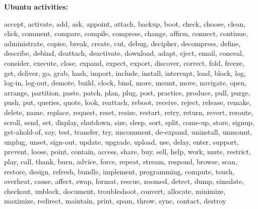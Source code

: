 \documentclass{article}
\begin{document}
\textbf{Ubuntu activities:}
\begin{framed}
\scriptsize
accept, activate, add, ask, appoint, attach, backup, boot, check, choose, clean, click, comment, compare, compile, compress, change, affirm, connect, continue, administrate, copies, break, create, cut, debug, decipher, decompress, define, describe, debind, deattach, deactivate, download, adapt, eject, email, conceal, consider, execute, close, expand, expect, export, discover, correct, fold, freeze, get, deliver, go, grab, hash, import, include, install, interrupt, load, block, log, log-in, log-out, demote, build, clock, bind, more, mount, move, navigate, open, arrange, partition, paste, patch, plan, plug, post, practice, produce, pull, purge, push, put, queries, quote, look, reattach, reboot, receive, reject, release, remake, delete, name, replace, request, reset, resize, restart, retry, return, revert, reroute, scroll, send, set, display, shutdown, size, sleep, sort, split, come-up, store, signup, get-ahold-of, say, test, transfer, try, uncomment, de-expand, uninstall, unmount, unplug, unset, sign-out, update, upgrade, upload, use, delay, enter, support, prevent, loose, point, contain, access, share, buy, sell, help, work, mute, restrict, play, call, thank, burn, advice, force, repeat, stream, respond, browse, scan, restore, design, refresh, bundle, implement, programming, compute, touch, overheat, cause, affect, swap, format, rescue, zoomed, detect, dump, simulate, checkout, unblock, document, troubleshoot, convert, allocate, minimize, maximize, redirect, maintain, print, spam, throw, sync, contact, destroy
\end{framed}

\newpage
\end{document}
